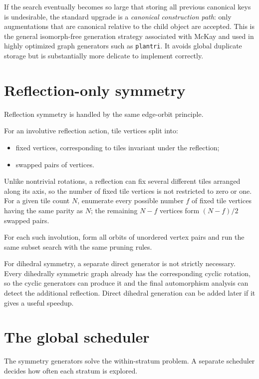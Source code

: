 \documentclass[11pt]{article}
\begin{document}
If the search eventually becomes so large that storing all previous canonical keys is undesirable, the standard upgrade is a \emph{canonical construction path}: only augmentations that are canonical relative to the child object are accepted. This is the general isomorph-free generation strategy associated with McKay and used in highly optimized graph generators such as \texttt{plantri}. It avoids global duplicate storage but is substantially more delicate to implement correctly.

\section{Reflection-only symmetry}

Reflection symmetry is handled by the same edge-orbit principle.

For an involutive reflection action, tile vertices split into:
\begin{itemize}
  \item fixed vertices, corresponding to tiles invariant under the reflection;
  \item swapped pairs of vertices.
\end{itemize}

Unlike nontrivial rotations, a reflection can fix several different tiles arranged along its axis, so the number of fixed tile vertices is not restricted to zero or one. For a given tile count \(N\), enumerate every possible number \(f\) of fixed tile vertices having the same parity as \(N\); the remaining \(N-f\) vertices form \((N-f)/2\) swapped pairs.

For each such involution, form all orbits of unordered vertex pairs and run the same subset search with the same pruning rules.

For dihedral symmetry, a separate direct generator is not strictly necessary. Every dihedrally symmetric graph already has the corresponding cyclic rotation, so the cyclic generators can produce it and the final automorphism analysis can detect the additional reflection. Direct dihedral generation can be added later if it gives a useful speedup.

\section{The global scheduler}

The symmetry generators solve the within-stratum problem. A separate scheduler decides how often each stratum is explored.
\end{document}

